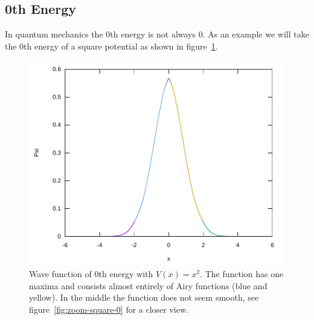 \documentclass[11pt,DIV=10,final]{scrreprt} %
\begin{document}
\subsection{0th Energy}
\begin{minipage}{\textwidth}
In quantum mechanics the 0th energy is not always 0. As an example we will take the 0th
energy of a square potential as shown in figure~\ref{fig:square-0}.
\begin{figure}[H]
  \centering
  \includegraphics[width=\textwidth]{plots/square-0.pdf}
  \caption{\label{fig:square-0} Wave function of 0th energy with $V(x) = x^{2}$. The function has one maxima and consists almost entirely of Airy functions (blue and yellow). In the middle the function does not seem smooth, see figure~\ref{fig:zoom-square-0} for a closer view.}
\end{figure}
\end{minipage}
\end{document}
